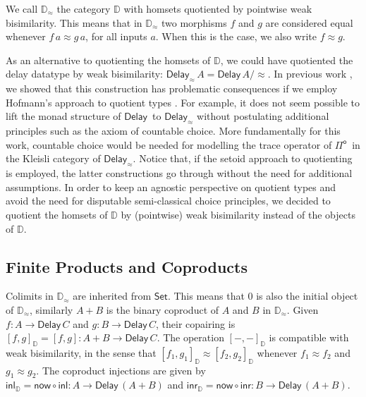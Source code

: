 \documentclass[runningheads,a4paper]{llncs}
\newcommand{\Pio}{\ensuremath{\mathsf{\Pi}^{\mathsf{o}}}}
\newcommand{\Set}{\mathsf{Set}}
\newcommand{\comp}{\circ}
\newcommand{\copair}[2]{[#1,#2]}
\newcommand{\inl}{\mathsf{inl}}
\newcommand{\inr}{\mathsf{inr}}
\newcommand{\Delay}{\ensuremath{\mathsf{Delay}\,}}
\newcommand{\now}{\mathsf{now}}
\newcommand{\D}{\mathbb{D}}
\newcommand{\Dapprox}{\mathbb{D}_{\approx}}
\newcommand{\copairD}[2]{[#1,#2]_{\D}}
\newcommand{\inlD}{\mathsf{inl}_{\D}}
\newcommand{\inrD}{\mathsf{inr}_{\D}}
\begin{document}
We call $\Dapprox$ the category $\D$ with homsets
quotiented by pointwise weak bisimilarity. This means that in
$\Dapprox$ two morphisms $f$ and $g$ are considered equal whenever
$f \, a \approx g \, a$, for all inputs $a$. When this is the case, we
also write $f \approx g$. 

As an alternative to quotienting the homsets of $\D$, we could have
quotiented the delay datatype by weak bisimilarity:
$\mathsf{Delay}_{\approx}\,A = \Delay A/{\approx}$. In previous work
\cite{ChapmanUV19}, we showed that this construction has problematic
consequences if we employ Hofmann's approach to quotient types
\cite{Hofmann}. For example, it does not seem possible to lift the
monad structure of $\Delay$ to $\mathsf{Delay}_{\approx}$ without
postulating additional principles such as the axiom of countable
choice. More fundamentally for this work, countable choice would be
needed for modelling the trace operator of \Pio\ in the Kleisli
category of $\mathsf{Delay}_{\approx}$. Notice that, if the setoid approach
to quotienting is employed, the latter constructions go through
without the need for additional assumptions. In order to keep an
agnostic perspective on quotient types and avoid the need for
disputable semi-classical choice principles, we decided to quotient
the homsets of $\D$ by (pointwise) weak bisimilarity instead of
the objects of $\D$.

\subsection{Finite Products and Coproducts}
\label{sec:prod}

Colimits in $\Dapprox$ are inherited from $\Set$. This means that 0 is
also the initial object of $\Dapprox$, similarly $A + B$ is the
binary coproduct of $A$ and $B$ in $\Dapprox$. Given $f : A \to
\Delay C$ and $g : B \to \Delay C$, their copairing is
$\copairD f g = \copair f g : A + B \to \Delay C$. The operation
$\copairD - -$ is compatible with weak bisimilarity, in the sense that
$\copairD{f_1}{g_1} \approx \copairD{f_2}{g_2}$ whenever $f_1 \approx f_2$
and $g_1 \approx g_2$.
The coproduct
injections are given by $\inlD = \now \comp \inl : A \to \Delay (A +
B)$ and $\inrD = \now \comp \inr : B \to \Delay (A + B)$.
\end{document}
